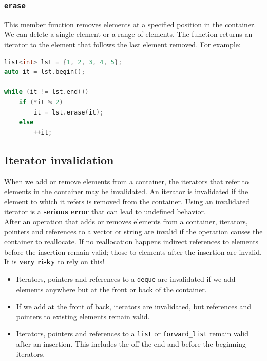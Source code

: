 \subsubsection{\texttt{erase}}

This member function removes elements at a specified position in the container. We can delete
a single element or a range of elements. The function returns an iterator to the element that
follows the last element removed. For example:

\begin{lstlisting}[language=C++]
list<int> lst = {1, 2, 3, 4, 5};
auto it = lst.begin();

while (it != lst.end())
    if (*it % 2)
        it = lst.erase(it);
    else
        ++it;
\end{lstlisting}

\subsection{Iterator invalidation}

When we add or remove elements from a container, the iterators that refer to elements in the
container may be invalidated. An iterator is invalidated if the element to which it refers is
removed from the container. Using an invalidated iterator is a \textbf{serious error} that
can lead to undefined behavior.\\

After an operation that adds or removes elements from a container, iterators, pointers and 
references to a vector or string are invalid if the operation causes the container to reallocate.
If no reallocation happens indirect references to elements before the insertion remain valid;
those to elements after the insertion are invalid. It is \textbf{very risky} to rely on this!\\

\begin{itemize}
    \item Iterators, pointers and references to a \texttt{deque} are invalidated if we add
    elements anywhere but at the front or back of the container.
    \item If we add at the front of back, iterators are invalidated, but references and pointers
    to existing elements remain valid.
    \item Iterators, pointers and references to a \texttt{list} or \texttt{forward\_list} remain
    valid after an insertion. This includes the off-the-end and before-the-beginning iterators.
\end{itemize}

